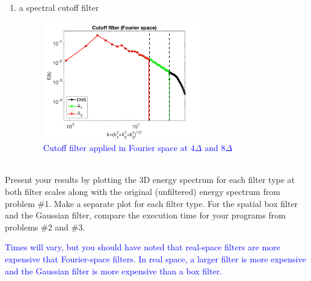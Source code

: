 \documentclass[11pt]{article}
\begin{document}
\begin{enumerate}[label=(\alph*),topsep=-10pt]
	\vspace{40pt}
	\item a spectral cutoff filter
	\begin{figure}[H]
	\centering
	\includegraphics[width=0.65\textwidth]{spectral_cutoff}
	~\\\textcolor{blue}{Cutoff filter applied in Fourier space at $4\Delta$ and $8\Delta$}
	\end{figure}
\end{enumerate}
~\\
Present your results by plotting the 3D energy spectrum for each filter type at both filter scales along with the original (unfiltered) energy spectrum from problem \#1. Make a separate plot for each filter type. For the spatial box filter and the Gaussian filter, compare the execution time for your programs from problems \#2 and \#3.

\textcolor{blue}{Times will vary, but you should have noted that real-space filters are more expensive that Fourier-space filters. In real space, a larger filter is more expensive and the Gaussian filter is more expensive than a box filter.}
\end{document}
